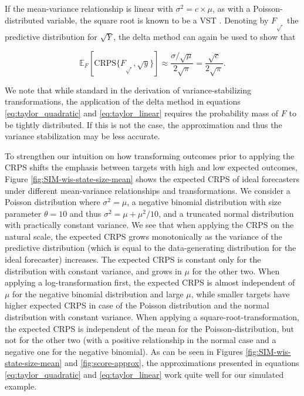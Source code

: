 \documentclass{article}
\begin{document}
If the mean-variance relationship is linear with $\sigma^2 = c \times \mu$, as with a Poisson-distributed variable, the square root is known to be a VST \citep{dunnGeneralizedLinearModels2018}. 
Denoting by $F_{\sqrt{\ }}$ the predictive distribution for $\sqrt{Y}$, the delta method can again be used to show that
\begin{linenomath*}
\begin{equation}
\mathbb{E}_F[\text{CRPS}\{F_{\sqrt{\ }}, \sqrt{y}\}] \approx \frac{\sigma/\sqrt{\mu}}{2\sqrt{\pi}} = \frac{\sqrt{c}}{2\sqrt{\pi}}
.\label{eq:taylor_linear}
\end{equation}
\end{linenomath*}
We note that while standard in the derivation of variance-stabilizing transformations, the application of the delta method in equations \eqref{eq:taylor_quadratic} and \eqref{eq:taylor_linear} requires the probability mass of $F$ to be tightly distributed. If this is not the case, the approximation and thus the variance stabilization may be less accurate.

To strengthen our intuition on how transforming outcomes prior to applying the CRPS shifts the emphasis between targets with high and low expected outcomes, Figure \ref{fig:SIM-wis-state-size-mean} shows the expected CRPS of ideal forecasters under different mean-variance relationships and transformations. We consider a Poisson distribution where $\sigma^2 = \mu$, a negative binomial distribution with size parameter $\theta = 10$ and thus $\sigma^2 = \mu + \mu^2/10$, and a truncated normal distribution with practically constant variance. We see that when applying the CRPS on the natural scale, the expected CRPS grows monotonically as the variance of the predictive distribution (which is equal to the data-generating distribution for the ideal forecaster) increases. The expected CRPS is constant only for the distribution with constant variance, and grows in $\mu$ for the other two. When applying a log-transformation first, the expected CRPS is almost independent of $\mu$ for the negative binomial distribution and large $\mu$, while smaller targets have higher expected CRPS in case of the Poisson distribution and the normal distribution with constant variance. When applying a square-root-transformation, the expected CRPS is independent of the mean for the Poisson-distribution, but not for the other two (with a positive relationship in the normal case and a negative one for the negative binomial). As can be seen in Figures \ref{fig:SIM-wis-state-size-mean} and \ref{fig:score-approx}, the approximations presented in equations \eqref{eq:taylor_quadratic} and \eqref{eq:taylor_linear} work quite well for our simulated example. 
\end{document}
